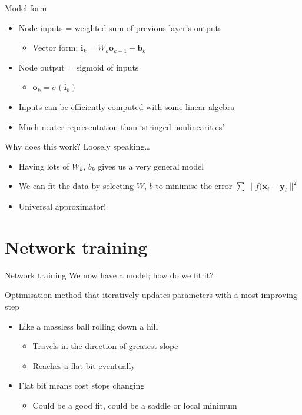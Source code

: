\documentclass[presentation]{beamer}
\begin{document}
\begin{frame}[<+->][label={sec:orgb9cb929}]{Model form}
\begin{itemize}
\item Node inputs = weighted sum of previous layer's outputs
\begin{itemize}
\item Vector form: \(\mathbf{i}_k = W_k \mathbf{o}_{k-1} + \mathbf{b}_k\)
\end{itemize}
\item Node output = sigmoid of inputs
\begin{itemize}
\item \(\mathbf{o}_k = \sigma(\mathbf{i}_k)\)
\end{itemize}
\item Inputs can be efficiently computed with some linear algebra
\item Much neater representation than `stringed nonlinearities'
\end{itemize}
\end{frame}

\begin{frame}[<+->][label={sec:orga0f0402}]{Why does this work?}
Loosely speaking\ldots{}
\vfill
\begin{itemize}
\item Having lots of \(W_k\), \(b_k\) gives us a very general model
\item We can fit the data by selecting \(W\), \(b\) to minimise the error \(\sum\| f(\mathbf{x}_i - \mathbf{y}_i \|^2\)
\item Universal approximator!
\end{itemize}
\end{frame}


\section{Network training}
\label{sec:org103eaae}
\begin{frame}[<+->][label={sec:orgfa6ccb1}]{Network training}
We now have a model; how do we fit it?

\begin{definition}
Optimisation method that iteratively updates parameters with a most-improving step
\end{definition}

\begin{itemize}
\item Like a massless ball rolling down a hill
\begin{itemize}
\item Travels in the direction of greatest slope
\item Reaches a flat bit eventually
\end{itemize}
\item Flat bit means cost stops changing
\begin{itemize}
\item Could be a good fit, could be a saddle or local minimum
\end{itemize}
\end{itemize}
\end{frame}
\end{document}
